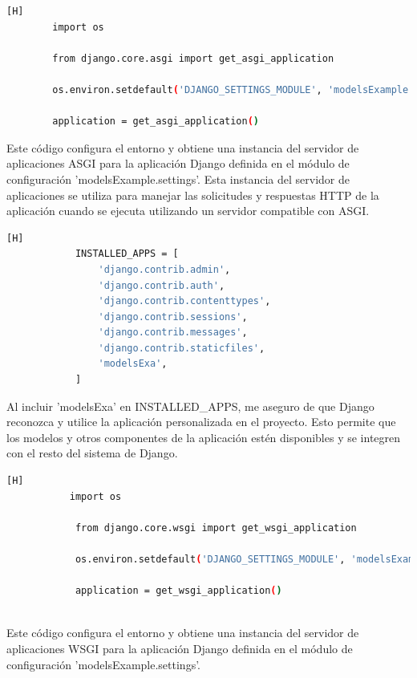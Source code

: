 \documentclass{article}
\begin{document}
        \begin{lstlisting}[language=bash,caption={asgi.py}][H]
        import os

        from django.core.asgi import get_asgi_application
        
        os.environ.setdefault('DJANGO_SETTINGS_MODULE', 'modelsExample.settings')
        
        application = get_asgi_application()

	\end{lstlisting}
   Este código configura el entorno y obtiene una instancia del servidor de aplicaciones ASGI para la aplicación Django definida en el módulo de configuración 'modelsExample.settings'. Esta instancia del servidor de aplicaciones se utiliza para manejar las solicitudes y respuestas HTTP de la aplicación cuando se ejecuta utilizando un servidor compatible con ASGI.
    
        \begin{lstlisting}[language=bash,caption={settings.py}][H]
            INSTALLED_APPS = [
                'django.contrib.admin',
                'django.contrib.auth',
                'django.contrib.contenttypes',
                'django.contrib.sessions',
                'django.contrib.messages',
                'django.contrib.staticfiles',
                'modelsExa',
            ]
	\end{lstlisting}
    Al incluir 'modelsExa' en INSTALLED\_APPS, me aseguro de que Django reconozca y utilice la aplicación personalizada en el proyecto. Esto permite que los modelos y otros componentes de la aplicación estén disponibles y se integren con el resto del sistema de Django.
        
        \begin{lstlisting}[language=bash,caption={wsgi.py}][H] 
           import os

            from django.core.wsgi import get_wsgi_application
            
            os.environ.setdefault('DJANGO_SETTINGS_MODULE', 'modelsExample.settings')
            
            application = get_wsgi_application()
            
	\end{lstlisting}
    Este código configura el entorno y obtiene una instancia del servidor de aplicaciones WSGI para la aplicación Django definida en el módulo de configuración 'modelsExample.settings'.

        
\end{document}
